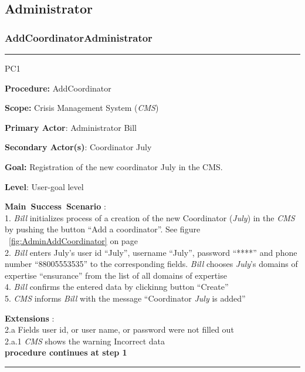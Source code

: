 \subsection{Administrator}

\subsubsection{AddCoordinatorAdministrator}

\vspace{0.5cm}
\hrule
\begin{lyxlist}{PC1}
\small{
\item [\textbf{Procedure:}] AddCoordinator
\item [\textbf{Scope:}] Crisis Management System (\emph{CMS})
\item [\textbf{Primary Actor}:] Administrator Bill
\item [\textbf{Secondary Actor(s)}:] Coordinator July
\item [\textbf{Goal:}] Registration of the new coordinator July in the CMS.
\item [\textbf{Level}:] User-goal level
\item [\textbf{Main~Success~Scenario}]:\\
1. \emph{Bill} initializes process of a creation of the new Coordinator
(\emph{July}) in the \emph{CMS} by pushing the button ``Add a coordinator''. See
figure ~\ref{fig:AdminAddCoordinator} on page~\pageref{fig:AdminAddCoordinator}\\
2. \emph{Bill} enters July's user id ``July'', username ``July'', password
``****'' and phone number ``88005553535'' to the corresponding fields.
\emph{Bill} chooses \emph{July}'s domains of expertise ``ensurance'' from the
list of all domains of expertise\\
4. \emph{Bill} confirms the entered data by clickinng button ``Create''\\
5. \emph{CMS} informs \emph{Bill} with the message ``Coordinator \emph{July} is
added''

\item [\textbf{Extensions}]:\\
2.a Fields user id, or user name, or password were not filled out\\
\hspace*{0.5cm} 2.a.1 \emph{CMS} shows the warning Incorrect data\\
\hspace*{0.5cm} \textbf{procedure continues at step 1}

}
\end{lyxlist}
\hrule
\vspace{0.5cm}

